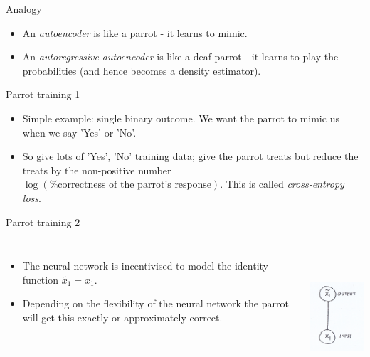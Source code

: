 \documentclass[usenames,dvipsnames]{beamer}
\begin{document}
\begin{frame}{Analogy}
  \begin{block}{}
    \begin{itemize}
      \item{An \textit{autoencoder} is like a parrot - it learns to mimic.}
	\item{An \textit{autoregressive autoencoder} is like a deaf parrot - it learns to play the probabilities (and hence becomes a density estimator).}
    \end{itemize}
  \end{block}
\end{frame}

\begin{frame}{Parrot training 1}
  \begin{block}{}
    \begin{itemize}
      \item{Simple example: single binary outcome. We want the parrot to mimic us when we say 'Yes' or 'No'.}
	\item{So give lots of 'Yes', 'No' training data; give the parrot treats but reduce the treats by the non-positive number $\log(\text{\% correctness of the parrot's response})$. This is called \textit{cross-entropy loss}.}
    \end{itemize}
  \end{block}
\end{frame}


\begin{frame}{Parrot training 2}
	\begin{columns}
    \begin{itemize}
      \item{The neural network is incentivised to model the identity function $\tilde{x_1} = x_1$.}
	\item{Depending on the flexibility of the neural network the parrot will get this exactly or approximately correct.}
    \end{itemize}
             \centering
             \includegraphics[height=5cm, width=3.5cm]{image_01}
         \end{columns} 
\end{frame}
\end{document}
